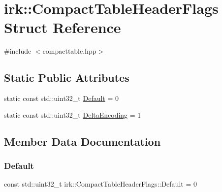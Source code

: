 \hypertarget{structirk_1_1CompactTableHeaderFlags}{}\section{irk\+:\+:Compact\+Table\+Header\+Flags Struct Reference}
\label{structirk_1_1CompactTableHeaderFlags}


{\ttfamily \#include $<$compacttable.\+hpp$>$}

\subsection*{Static Public Attributes}
\begin{DoxyCompactItemize}
\item 
static const std\+::uint32\+\_\+t \mbox{\hyperlink{structirk_1_1CompactTableHeaderFlags_a18debbc227dbcb7726817a08b541e5e0}{Default}} = 0
\item 
static const std\+::uint32\+\_\+t \mbox{\hyperlink{structirk_1_1CompactTableHeaderFlags_af00ac402429458ce945d2fa2313f66bc}{Delta\+Encoding}} = 1
\end{DoxyCompactItemize}


\subsection{Member Data Documentation}
\mbox{\label{structirk_1_1CompactTableHeaderFlags_a18debbc227dbcb7726817a08b541e5e0}} 
\subsubsection{\texorpdfstring{Default}{Default}}
{\footnotesize\ttfamily const std\+::uint32\+\_\+t irk\+::\+Compact\+Table\+Header\+Flags\+::\+Default = 0\hspace{0.3cm}{\ttfamily [static]}}

\mbox{\label{structirk_1_1CompactTableHeaderFlags_af00ac402429458ce945d2fa2313f66bc}} 
